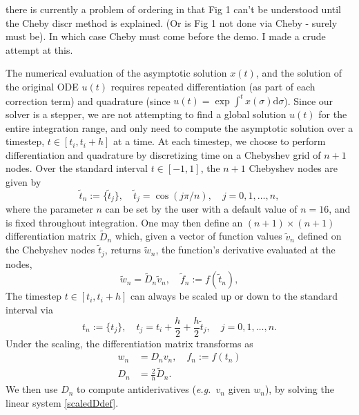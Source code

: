 \documentclass[10pt]{article}
\newcommand{\be}{\begin{equation}}
\newcommand{\ee}{\end{equation}}
\newcommand{\eg}{{\it e.g.\ }}
\newcommand{\om}{\omega}
\newcommand{\AB}[1]{{\color{orange}#1}}
\begin{document}
\AB{there is currently a problem of ordering in that Fig 1 can't be understood until the Cheby discr method is explained. (Or is Fig 1 not done via Cheby - surely must be). In which case Cheby must come before the demo. I made a crude attempt at this.}

The numerical evaluation of the asymptotic solution $x(t)$, and the solution of
the original ODE $u(t)$ requires repeated differentiation (as part of each
correction term) and quadrature (since $u(t) = \exp \int^t x(\sigma)
\mathrm{d}\sigma$). 
Since our solver is a stepper, we are not attempting to find a global solution
$u(t)$ for the entire integration range, and only need to compute the
asymptotic solution over a timestep, $t \in [t_i, t_i+h]$ at a time. At each 
timestep, we choose to perform differentiation and quadrature by discretizing
time on a Chebyshev grid of $n + 1$ nodes.  
Over the standard interval $t \in [-1, 1]$, the $n+1$ Chebyshev nodes are given by 
\be\label{chebnodes}
\tilde{t}_n := \{\tilde{t}_j\}, \quad \tilde{t}_j = \cos\left( j\pi/n\right), \quad j = 0, 1, \ldots, n,
\ee
where the parameter $n$ can be set by the user with a default value of $n = 16$, and is fixed throughout integration. 
One may then define an $(n+1) \times (n+1)$ differentiation matrix $\tilde{D}_n$ which, given a vector of function
values $\tilde{v}_n$ defined on the Chebyshev nodes $\tilde{t}_j$, returns $\tilde{w}_n$, the function's
derivative evaluated at the nodes,
\be\label{diffmat}
\tilde{w}_n = \tilde{D}_n\tilde{v}_n, \quad \tilde{f}_n := f(\tilde{t}_n),
\ee
The timestep $t \in [t_i, t_i+h]$ can always be scaled up or down to the standard interval via
\be\label{scaledt}
t_n := \{ t_j \}, \quad t_j = t_i + \frac{h}{2} + \frac{h}{2}\tilde{t}_j, \quad j = 0, 1, \ldots, n. 
\ee
Under the scaling, the differentiation matrix transforms as
\begin{align}
    w_n &= D_nv_n, \quad f_n := f(t_n) \label{scaledDdef}\\
    D_n &= \frac{2}{h}\tilde{D}_n. \label{scaledD}
\end{align}
We then use $D_n$ to compute antiderivatives (\eg $v_n$ given $w_n$), by
solving the
linear system \cref{scaledDdef}. 

\end{document}
